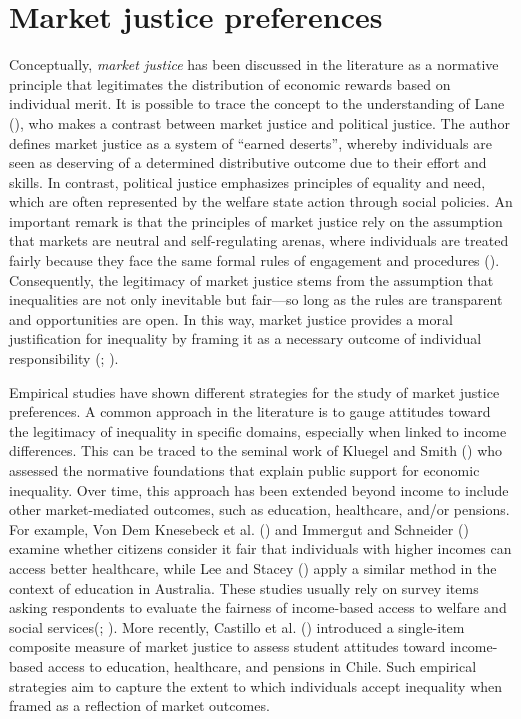 \documentclass[
  12pt,
]{article}
\begin{document}
\section{Market justice preferences}\label{market-justice-preferences}

Conceptually, \emph{market justice} has been discussed in the literature
as a normative principle that legitimates the distribution of economic
rewards based on individual merit. It is possible to trace the concept
to the understanding of Lane (),
who makes a contrast between market justice and political justice. The
author defines market justice as a system of ``earned deserts'', whereby
individuals are seen as deserving of a determined distributive outcome
due to their effort and skills. In contrast, political justice
emphasizes principles of equality and need, which are often represented
by the welfare state action through social policies. An important remark
is that the principles of market justice rely on the assumption that
markets are neutral and self-regulating arenas, where individuals are
treated fairly because they face the same formal rules of engagement and
procedures (). Consequently,
the legitimacy of market justice stems from the assumption that
inequalities are not only inevitable but fair---so long as the rules are
transparent and opportunities are open. In this way, market justice
provides a moral justification for inequality by framing it as a
necessary outcome of individual responsibility
(;
).

Empirical studies have shown different strategies for the study of
market justice preferences. A common approach in the literature is to
gauge attitudes toward the legitimacy of inequality in specific domains,
especially when linked to income differences. This can be traced to the
seminal work of Kluegel and Smith
() who assessed the normative
foundations that explain public support for economic inequality. Over
time, this approach has been extended beyond income to include other
market-mediated outcomes, such as education, healthcare, and/or
pensions. For example, Von Dem Knesebeck et al.
() and Immergut and
Schneider () examine whether
citizens consider it fair that individuals with higher incomes can
access better healthcare, while Lee and Stacey
() apply a similar method in the
context of education in Australia. These studies usually rely on survey
items asking respondents to evaluate the fairness of income-based access
to welfare and social services(; ). More
recently, Castillo et al.
() introduced a
single-item composite measure of market justice to assess student
attitudes toward income-based access to education, healthcare, and
pensions in Chile. Such empirical strategies aim to capture the extent
to which individuals accept inequality when framed as a reflection of
market outcomes.
\end{document}
